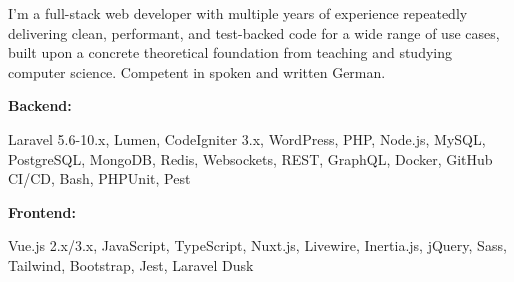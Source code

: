 \documentclass[9pt]{developercv} %
\begin{document}
\begin{minipage}[t]{0.46\textwidth}
	\vspace{-6pt}
 
I'm a full-stack web developer with multiple years of experience repeatedly delivering clean, performant, and test-backed code for a wide range of use cases, built upon a concrete theoretical foundation from teaching and studying computer science. Competent in spoken and written German.
 
\end{minipage}
\hfill %
\begin{minipage}[t]{0.465\textwidth}
    \vspace{-6pt}
    
    \begin{minipage}[t]{0.2\textwidth}
        \textbf{Backend:}
    \end{minipage}
    \hfill
    \begin{minipage}[t]{0.73\textwidth}
      Laravel 5.6-10.x, Lumen, CodeIgniter 3.x, WordPress, PHP, Node.js, MySQL, PostgreSQL, MongoDB, Redis, Websockets, REST, GraphQL, Docker, GitHub CI/CD, Bash, PHPUnit, Pest
    \end{minipage}
    \vspace{4mm}
    
    \begin{minipage}[t]{0.2\textwidth}
        \textbf{Frontend:}
    \end{minipage}
    \hfill
    \begin{minipage}[t]{0.73\textwidth}
    Vue.js 2.x/3.x, JavaScript, TypeScript, Nuxt.js, Livewire, Inertia.js, jQuery, Sass, Tailwind, Bootstrap, Jest, Laravel Dusk
    \end{minipage}
    
\end{minipage}
\end{document}
